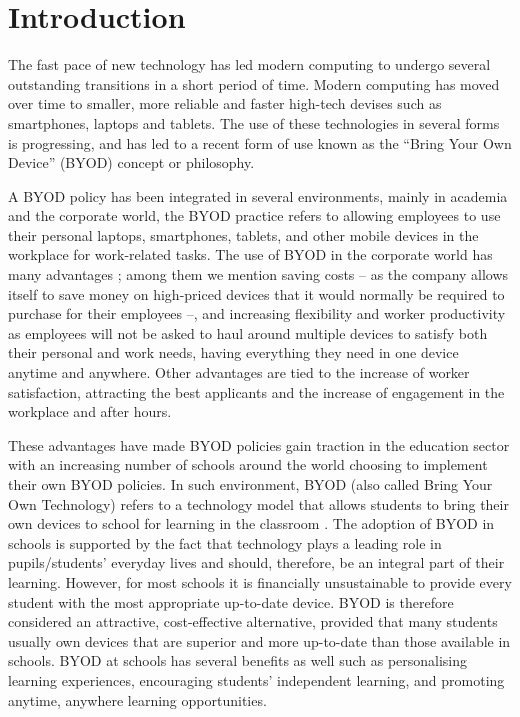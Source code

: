 \documentclass[a4paper,10pt,twocolumn,preprint,3p]{elsarticle}
\begin{document}
\section{Introduction}
\label{sec:intro}
The fast pace of new technology has led modern computing to undergo
several outstanding transitions in a short period of time. Modern computing has moved
over time to smaller, more reliable and faster high-tech devises such%
as smartphones, laptops and tablets. The use of these technologies in
several forms is progressing, and has led to a recent form of use known as
the ``Bring Your Own Device'' (BYOD) concept or philosophy. %

A BYOD policy has been integrated in several environments, mainly in %
academia and the corporate world, the BYOD
practice refers to allowing employees to use their
personal laptops, smartphones, tablets, and other mobile devices in
the workplace for work-related tasks. The use of BYOD in the corporate world has many
advantages \cite{singh2012byod}; among them we mention saving costs --
as the company allows itself to save money on high-priced devices that
it would normally be required to purchase for their employees --, and
increasing flexibility and worker productivity as employees will not
be asked to haul around multiple devices to satisfy both their personal and
work needs, having everything they need in one device anytime and
anywhere.  
Other advantages are tied to the increase of worker satisfaction,  attracting the best applicants and the increase of engagement in the workplace and after hours. %

These advantages have made BYOD policies gain traction in the education
sector with an increasing number of schools around the world choosing
to implement their own BYOD policies. %
In such environment, BYOD (also
called Bring Your Own Technology) refers to a technology model that
allows students to bring their own devices to school for learning in
the classroom \cite{sangani2013byod, song2014bring}. The adoption of BYOD in schools
is supported by the fact that technology plays a leading role in
pupils/students' everyday lives and should, therefore, be an integral
part of their learning. However, for most schools it is financially
unsustainable to provide every student with the most appropriate
up-to-date device. BYOD is therefore considered an attractive,
cost-effective alternative, provided that many students usually own
devices that are superior and more up-to-date than those available in
schools. BYOD at schools has several benefits as well such as
personalising learning experiences, encouraging students' independent
learning, and promoting anytime, anywhere learning opportunities. %
\end{document}
